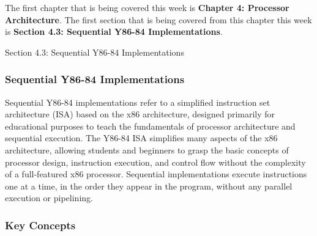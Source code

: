 The first chapter that is being covered this week is \textbf{Chapter 4: Processor Architecture}. The first section that is being covered from this chapter this week is \textbf{Section 4.3: Sequential Y86-84 Implementations}.

\begin{notes}{Section 4.3: Sequential Y86-84 Implementations}
    \subsubsection*{Sequential Y86-84 Implementations}

    Sequential Y86-84 implementations refer to a simplified instruction set architecture (ISA) based on the x86 architecture, designed primarily for educational purposes to teach the fundamentals of 
    processor architecture and sequential execution. The Y86-84 ISA simplifies many aspects of the x86 architecture, allowing students and beginners to grasp the basic concepts of processor design, 
    instruction execution, and control flow without the complexity of a full-featured x86 processor. Sequential implementations execute instructions one at a time, in the order they appear in the 
    program, without any parallel execution or pipelining. \vspace*{1em}
    
    \subsubsection*{Key Concepts}
    

\end{notes}
